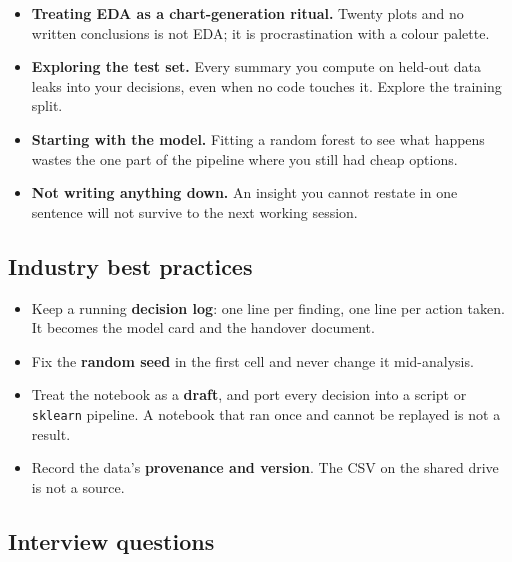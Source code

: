 \documentclass[11pt,a4paper]{article}
\begin{document}
\begin{itemize}\itemsep3pt
  \item \textbf{Treating EDA as a chart-generation ritual.} Twenty plots and no written
        conclusions is not EDA; it is procrastination with a colour palette.
  \item \textbf{Exploring the test set.} Every summary you compute on held-out data leaks
        into your decisions, even when no code touches it. Explore the training split.
  \item \textbf{Starting with the model.} Fitting a random forest to see what happens
        wastes the one part of the pipeline where you still had cheap options.
  \item \textbf{Not writing anything down.} An insight you cannot restate in one sentence
        will not survive to the next working session.
\end{itemize}

\subsection*{Industry best practices}

\begin{itemize}\itemsep3pt
  \item Keep a running \textbf{decision log}: one line per finding, one line per action
        taken. It becomes the model card and the handover document.
  \item Fix the \textbf{random seed} in the first cell and never change it mid-analysis.
  \item Treat the notebook as a \textbf{draft}, and port every decision into a script or
        \lstinline|sklearn| pipeline. A notebook that ran once and cannot be replayed is
        not a result.
  \item Record the data's \textbf{provenance and version}. The CSV on the shared drive is
        not a source.
\end{itemize}

\subsection*{Interview questions}
\end{document}

